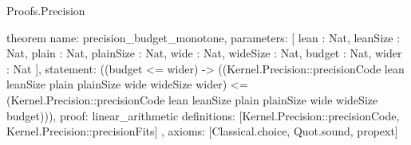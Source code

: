 \begin{lexlean}{Proofs.Precision}
\begin{semanticmodule}
theorem{
  name: precision_budget_monotone,
  parameters: [
    lean : Nat,
    leanSize : Nat,
    plain : Nat,
    plainSize : Nat,
    wide : Nat,
    wideSize : Nat,
    budget : Nat,
    wider : Nat
  ],
  statement: ((budget <= wider) -> ((Kernel.Precision::precisionCode lean leanSize plain plainSize wide wideSize wider) <= (Kernel.Precision::precisionCode lean leanSize plain plainSize wide wideSize budget))),
  proof: linear_arithmetic{
    definitions: [Kernel.Precision::precisionCode, Kernel.Precision::precisionFits]
  },
  axioms: [Classical.choice, Quot.sound, propext]
}
\end{semanticmodule}
\end{lexlean}
